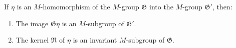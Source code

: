 If $\eta$ is an $M$-homomorphism of the $M$-group $\mathfrak{G}$ into the $M$-group $\mathfrak{G}'$, then:
\begin{enumerate}
\item The image $\mathfrak{G}\eta$ is an $M$-subgroup of $\mathfrak{G}'$.
\item The kernel $\mathfrak{R}$ of $\eta$ is an invariant $M$-subgroup of $\mathfrak{G}$.
\end{enumerate}
